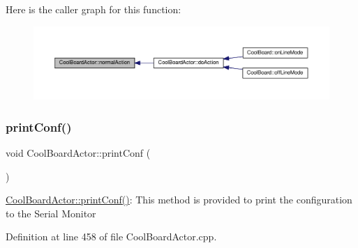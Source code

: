 Here is the caller graph for this function\+:\nopagebreak
\begin{figure}[H]
\begin{center}
\leavevmode
\includegraphics[width=350pt]{dc/d69/class_cool_board_actor_a81229abf5895f4d3b0355050b822b438_icgraph}
\end{center}
\end{figure}
\mbox{\label{class_cool_board_actor_aabb10e7aebc3249ffc940530de29f84a}} 
\subsubsection{\texorpdfstring{print\+Conf()}{printConf()}}
{\footnotesize\ttfamily void Cool\+Board\+Actor\+::print\+Conf (\begin{DoxyParamCaption}{ }\end{DoxyParamCaption})}

\hyperlink{class_cool_board_actor_aabb10e7aebc3249ffc940530de29f84a}{Cool\+Board\+Actor\+::print\+Conf()}\+: This method is provided to print the configuration to the Serial Monitor 

Definition at line 458 of file Cool\+Board\+Actor.\+cpp.


